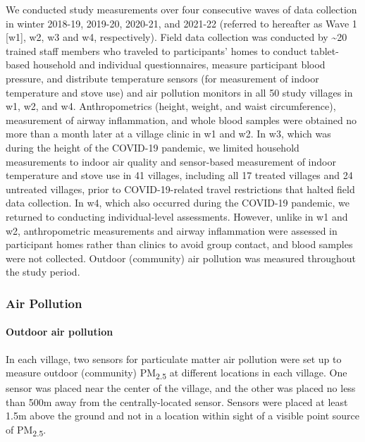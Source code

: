 \documentclass[
  letterpaper,
  DIV=11,
  numbers=noendperiod]{scrartcl}
\let\oldparagraph\paragraph
\renewcommand{\paragraph}[1]{\oldparagraph{#1}\mbox{}}
\begin{document}
We conducted study measurements over four consecutive waves of data
collection in winter 2018-19, 2019-20, 2020-21, and 2021-22 (referred to
hereafter as Wave 1 {[}w1{]}, w2, w3 and w4, respectively). Field data
collection was conducted by \textasciitilde20 trained staff members who
traveled to participants' homes to conduct tablet-based household and
individual questionnaires, measure participant blood pressure, and
distribute temperature sensors (for measurement of indoor temperature
and stove use) and air pollution monitors in all 50 study villages in
w1, w2, and w4. Anthropometrics (height, weight, and waist
circumference), measurement of airway inflammation, and whole blood
samples were obtained no more than a month later at a village clinic in
w1 and w2. In w3, which was during the height of the COVID-19 pandemic,
we limited household measurements to indoor air quality and sensor-based
measurement of indoor temperature and stove use in 41 villages,
including all 17 treated villages and 24 untreated villages, prior to
COVID-19-related travel restrictions that halted field data collection.
In w4, which also occurred during the COVID-19 pandemic, we returned to
conducting individual-level assessments. However, unlike in w1 and w2,
anthropometric measurements and airway inflammation were assessed in
participant homes rather than clinics to avoid group contact, and blood
samples were not collected. Outdoor (community) air pollution was
measured throughout the study period.

\hypertarget{air-pollution}{%
\subsubsection{Air Pollution}\label{air-pollution}}

\hypertarget{outdoor-air-pollution}{%
\paragraph{Outdoor air pollution}\label{outdoor-air-pollution}}

In each village, two sensors for particulate matter air pollution were
set up to measure outdoor (community) PM\textsubscript{2.5} at different
locations in each village. One sensor was placed near the center of the
village, and the other was placed no less than 500m away from the
centrally-located sensor. Sensors were placed at least 1.5m above the
ground and not in a location within sight of a visible point source of
PM\textsubscript{2.5}.
\end{document}
